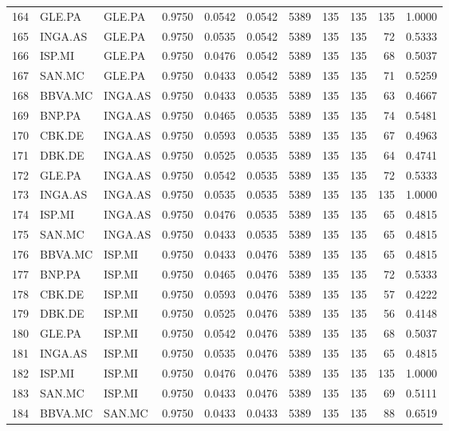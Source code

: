 \begin{table}
\begin{tabular}{lllrrrrrrrr}
164 & GLE.PA & GLE.PA & 0.9750 & 0.0542 & 0.0542 & 5389 & 135 & 135 & 135 & 1.0000 \\
165 & INGA.AS & GLE.PA & 0.9750 & 0.0535 & 0.0542 & 5389 & 135 & 135 & 72 & 0.5333 \\
166 & ISP.MI & GLE.PA & 0.9750 & 0.0476 & 0.0542 & 5389 & 135 & 135 & 68 & 0.5037 \\
167 & SAN.MC & GLE.PA & 0.9750 & 0.0433 & 0.0542 & 5389 & 135 & 135 & 71 & 0.5259 \\
168 & BBVA.MC & INGA.AS & 0.9750 & 0.0433 & 0.0535 & 5389 & 135 & 135 & 63 & 0.4667 \\
169 & BNP.PA & INGA.AS & 0.9750 & 0.0465 & 0.0535 & 5389 & 135 & 135 & 74 & 0.5481 \\
170 & CBK.DE & INGA.AS & 0.9750 & 0.0593 & 0.0535 & 5389 & 135 & 135 & 67 & 0.4963 \\
171 & DBK.DE & INGA.AS & 0.9750 & 0.0525 & 0.0535 & 5389 & 135 & 135 & 64 & 0.4741 \\
172 & GLE.PA & INGA.AS & 0.9750 & 0.0542 & 0.0535 & 5389 & 135 & 135 & 72 & 0.5333 \\
173 & INGA.AS & INGA.AS & 0.9750 & 0.0535 & 0.0535 & 5389 & 135 & 135 & 135 & 1.0000 \\
174 & ISP.MI & INGA.AS & 0.9750 & 0.0476 & 0.0535 & 5389 & 135 & 135 & 65 & 0.4815 \\
175 & SAN.MC & INGA.AS & 0.9750 & 0.0433 & 0.0535 & 5389 & 135 & 135 & 65 & 0.4815 \\
176 & BBVA.MC & ISP.MI & 0.9750 & 0.0433 & 0.0476 & 5389 & 135 & 135 & 65 & 0.4815 \\
177 & BNP.PA & ISP.MI & 0.9750 & 0.0465 & 0.0476 & 5389 & 135 & 135 & 72 & 0.5333 \\
178 & CBK.DE & ISP.MI & 0.9750 & 0.0593 & 0.0476 & 5389 & 135 & 135 & 57 & 0.4222 \\
179 & DBK.DE & ISP.MI & 0.9750 & 0.0525 & 0.0476 & 5389 & 135 & 135 & 56 & 0.4148 \\
180 & GLE.PA & ISP.MI & 0.9750 & 0.0542 & 0.0476 & 5389 & 135 & 135 & 68 & 0.5037 \\
181 & INGA.AS & ISP.MI & 0.9750 & 0.0535 & 0.0476 & 5389 & 135 & 135 & 65 & 0.4815 \\
182 & ISP.MI & ISP.MI & 0.9750 & 0.0476 & 0.0476 & 5389 & 135 & 135 & 135 & 1.0000 \\
183 & SAN.MC & ISP.MI & 0.9750 & 0.0433 & 0.0476 & 5389 & 135 & 135 & 69 & 0.5111 \\
184 & BBVA.MC & SAN.MC & 0.9750 & 0.0433 & 0.0433 & 5389 & 135 & 135 & 88 & 0.6519 \\

\end{tabular}
\end{table}
